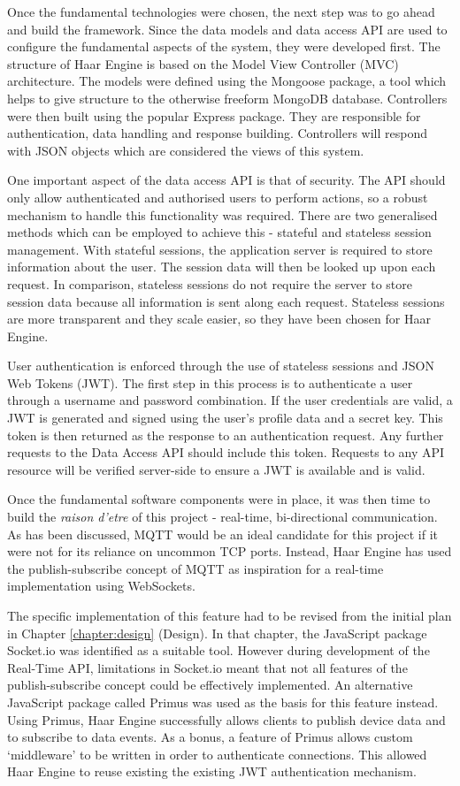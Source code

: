     Once the fundamental technologies were chosen, the next step was to go ahead and build the framework. Since the data models and data access API are used to configure the fundamental aspects of the system, they were developed first. The structure of Haar Engine is based on the Model View Controller (MVC) architecture. The models were defined using the Mongoose package, a tool which helps to give structure to the otherwise freeform MongoDB database. Controllers were then built using the popular Express package. They are responsible for authentication, data handling and response building. Controllers will respond with JSON objects which are considered the views of this system.

    One important aspect of the data access API is that of security. The API should only allow authenticated and authorised users to perform actions, so a robust mechanism to handle this functionality was required. There are two generalised methods which can be employed to achieve this - stateful and stateless session management. With stateful sessions, the application server is required to store information about the user. The session data will then be looked up upon each request. In comparison, stateless sessions do not require the server to store session data because all information is sent along each request. Stateless sessions are more transparent and they scale easier, so they have been chosen for Haar Engine.

    User authentication is enforced through the use of stateless sessions and JSON Web Tokens (JWT). The first step in this process is to authenticate a user through a username and password combination. If the user credentials are valid, a JWT is generated and signed using the user's profile data and a secret key. This token is then returned as the response to an authentication request. Any further requests to the Data Access API should include this token. Requests to any API resource will be verified server-side to ensure a JWT is available and is valid.

    Once the fundamental software components were in place, it was then time to build the \textit{raison d'etre} of this project - real-time, bi-directional communication. As has been discussed, MQTT would be an ideal candidate for this project if it were not for its reliance on uncommon TCP ports. Instead, Haar Engine has used the publish-subscribe concept of MQTT as inspiration for a real-time implementation using WebSockets.

    The specific implementation of this feature had to be revised from the initial plan in Chapter \ref{chapter:design} (Design). In that chapter, the JavaScript package Socket.io was identified as a suitable tool. However during development of the Real-Time API, limitations in Socket.io meant that not all features of the publish-subscribe concept could be effectively implemented. An alternative JavaScript package called Primus was used as the basis for this feature instead. Using Primus, Haar Engine successfully allows clients to publish device data and to subscribe to data events. As a bonus, a feature of Primus allows custom `middleware' to be written in order to authenticate connections. This allowed Haar Engine to reuse existing the existing JWT authentication mechanism.

